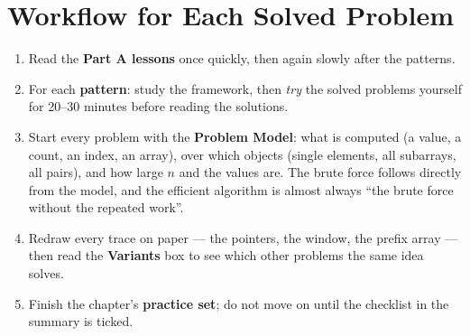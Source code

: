 \section*{Workflow for Each Solved Problem}

\begin{insightbox}
\begin{center}
\end{center}
\begin{enumerate}[leftmargin=*]
    \item Read the \textbf{Part A lessons} once quickly, then again slowly after the patterns.
    \item For each \textbf{pattern}: study the framework, then \emph{try} the solved problems yourself for 20--30 minutes before reading the solutions.
    \item Start every problem with the \textbf{Problem Model}: what is computed (a value, a count, an index, an array), over which objects (single elements, all subarrays, all pairs), and how large $n$ and the values are. The brute force follows directly from the model, and the efficient algorithm is almost always ``the brute force without the repeated work''.
    \item Redraw every trace on paper --- the pointers, the window, the prefix array --- then read the \textbf{Variants} box to see which other problems the same idea solves.
    \item Finish the chapter's \textbf{practice set}; do not move on until the checklist in the summary is ticked.
\end{enumerate}
\end{insightbox}


